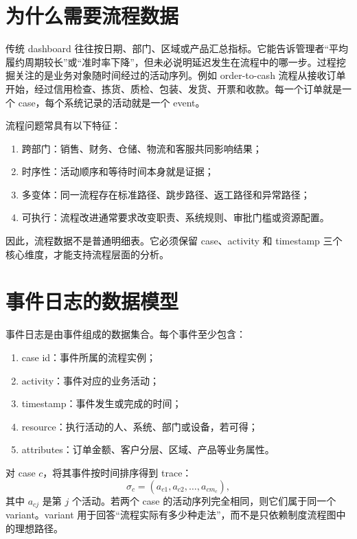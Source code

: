 \documentclass[UTF8,fontset=fandol,openany,zihao=-4]{ctexbook}
\begin{document}
\section{为什么需要流程数据}

传统 dashboard 往往按日期、部门、区域或产品汇总指标。它能告诉管理者“平均履约周期较长”或“准时率下降”，但未必说明延迟发生在流程中的哪一步。过程挖掘关注的是业务对象随时间经过的活动序列。例如 order-to-cash 流程从接收订单开始，经过信用检查、拣货、质检、包装、发货、开票和收款。每一个订单就是一个 case，每个系统记录的活动就是一个 event。

流程问题常具有以下特征：
\begin{enumerate}
  \item 跨部门：销售、财务、仓储、物流和客服共同影响结果；
  \item 时序性：活动顺序和等待时间本身就是证据；
  \item 多变体：同一流程存在标准路径、跳步路径、返工路径和异常路径；
  \item 可执行：流程改进通常要求改变职责、系统规则、审批门槛或资源配置。
\end{enumerate}

因此，流程数据不是普通明细表。它必须保留 case、activity 和 timestamp 三个核心维度，才能支持流程层面的分析。

\section{事件日志的数据模型}

\begin{definition}[事件日志]
事件日志是由事件组成的数据集合。每个事件至少包含：
\begin{enumerate}
  \item case id：事件所属的流程实例；
  \item activity：事件对应的业务活动；
  \item timestamp：事件发生或完成的时间；
  \item resource：执行活动的人、系统、部门或设备，若可得；
  \item attributes：订单金额、客户分层、区域、产品等业务属性。
\end{enumerate}
\end{definition}

对 case \(c\)，将其事件按时间排序得到 trace：
\[
  \sigma_c=(a_{c1},a_{c2},\ldots,a_{cm_c}),
\]
其中 \(a_{cj}\) 是第 \(j\) 个活动。若两个 case 的活动序列完全相同，则它们属于同一个 variant。variant 用于回答“流程实际有多少种走法”，而不是只依赖制度流程图中的理想路径。
\end{document}
